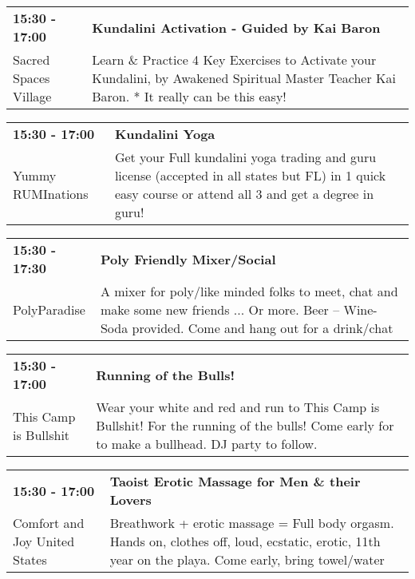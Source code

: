 \begin{tabular}{ p{1in} p{2.2in} }
    \textbf{15:30 - 17:00} & \textbf{Kundalini Activation - Guided by Kai Baron} \\
    Sacred Spaces Village \newline  & Learn \& Practice 4 Key Exercises to Activate your Kundalini, by Awakened Spiritual Master Teacher Kai Baron.  * It really can be this easy! \\
    \hline 
\end{tabular}
    
\begin{tabular}{ p{1in} p{2.2in} }
    \textbf{15:30 - 17:00} & \textbf{Kundalini Yoga} \\
    Yummy RUMInations \newline  & Get your Full kundalini yoga trading and guru license (accepted in all states but FL) in 1 quick easy course or attend all 3 and get a degree in guru! \\
    \hline 
\end{tabular}
    
\begin{tabular}{ p{1in} p{2.2in} }
    \textbf{15:30 - 17:30} & \textbf{Poly Friendly Mixer/Social } \\
    PolyParadise \newline  & A mixer for poly/like minded folks to meet, chat and make some new friends ... Or more. Beer -- Wine- Soda provided. Come and hang out for a drink/chat \\
    \hline 
\end{tabular}
    
\begin{tabular}{ p{1in} p{2.2in} }
    \textbf{15:30 - 17:00} & \textbf{Running of the Bulls!} \\
    This Camp is Bullshit \newline  & Wear your white and red and run to This Camp is Bullshit!  For the running of the bulls!  Come early for to make a bullhead.  DJ party to follow. \\
    \hline 
\end{tabular}
    
\begin{tabular}{ p{1in} p{2.2in} }
    \textbf{15:30 - 17:00} & \textbf{Taoist Erotic Massage for Men \& their Lovers} \\
    Comfort and Joy \newline United States & Breathwork + erotic massage = Full body orgasm.  Hands on, clothes off, loud, ecstatic, erotic, 11th year on the playa. Come early, bring towel/water \\
    \hline 
\end{tabular}
    
